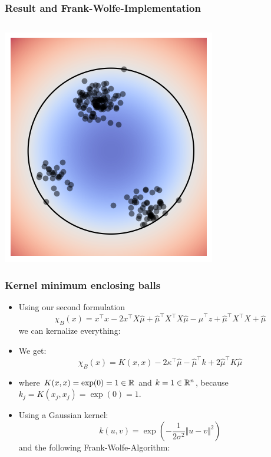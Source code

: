 \documentclass[10pt,aspectratio=169,handout]{beamer}
\begin{document}
\begin{frame}
    \frametitle{Result and Frank-Wolfe-Implementation}
    \begin{minipage}{0.49\textwidth}
        \inputminted[bgcolor=LightGray,fontsize=\small]{python}{code/frank_wolfe.py}
    \end{minipage}
    \begin{minipage}{0.49\textwidth}
        \includegraphics[width=\textwidth]{images/task5-5-2.png}
    \end{minipage}
\end{frame}

\begin{frame}
    \frametitle{\textbf{Kernel} minimum enclosing balls}

    \begin{itemize}
        \item Using our second formulation \[\chi_B(x)=x^\intercal x-2x^\intercal X \hat{\mu}+\hat{\mu}^\intercal X^\intercal X \hat{\mu}-\hat{\mu}^\intercal z+\hat{\mu}^\intercal X^\intercal X+\hat{\mu}\]
            we can kernalize everything:
        \item We get:\[\chi_B(x)=K(x,x)-2\kappa^\intercal\hat{\mu}-\hat{\mu}^\intercal k+2\hat{\mu}^\intercal K \hat{\mu}\]
        \item where $K(x,x)=\exp(0)=1\in\mathbb{R}$ and  $k=1\in\mathbb{R}^n$, because $k_j=K(x_j,x_j)=\exp(0)=1$.
        \item Using a Gaussian kernel: \[k(u,v)=\exp(-\frac{1}{2\sigma^2}\Vert u-v\Vert^2)\] and the following Frank-Wolfe-Algorithm:
    \end{itemize}

\end{frame}
\end{document}
